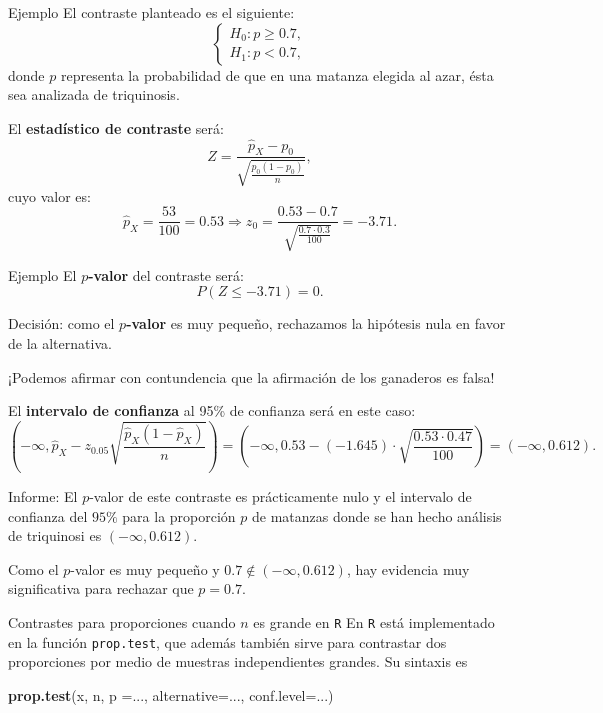 \documentclass[
  ignorenonframetext,
]{beamer}
\newenvironment{Shaded}{\begin{snugshade}}{\end{snugshade}}
\newcommand{\DataTypeTok}[1]{\textcolor[rgb]{0.13,0.29,0.53}{#1}}
\newcommand{\KeywordTok}[1]{\textcolor[rgb]{0.13,0.29,0.53}{\textbf{#1}}}
\newcommand{\NormalTok}[1]{#1}
\begin{document}
\begin{frame}{Ejemplo}
\protect\hypertarget{ejemplo-16}{}
El contraste planteado es el siguiente: \[\left\{\begin{array}{l}
H_0:p\geq 0.7,\\
H_1:p<0.7,
\end{array}
\right.\] donde \(p\) representa la probabilidad de que en una matanza
elegida al azar, ésta sea analizada de triquinosis.

El \textbf{estadístico de contraste} será: \[
Z=\frac{\widehat{p}_X-p_0}{\sqrt{\frac{p_0(1-p_0)}{n}}},
\] cuyo valor es: \[
\widehat{p}_X=\frac{53}{100}=0.53\Longrightarrow 
z_0=\frac{0.53-0.7}{\sqrt{\frac{0.7\cdot 0.3}{100}}}=-3.71.
\]
\end{frame}

\begin{frame}{Ejemplo}
\protect\hypertarget{ejemplo-17}{}
El \textbf{\(p\)-valor} del contraste será: \[
P(Z\leq -3.71)=0.
\]

Decisión: como el \textbf{\(p\)-valor} es muy pequeño, rechazamos la
hipótesis nula en favor de la alternativa.

¡Podemos afirmar con contundencia que la afirmación de los ganaderos es
falsa!

El \textbf{intervalo de confianza} al 95\% de confianza será en este
caso: \[
\left(-\infty,\widehat{p}_X-z_{0.05}\sqrt{\frac{\widehat{p}_X(1-\widehat{p}_X)}{n}}\right)=\left(-\infty,0.53 -(-1.645)\cdot \sqrt{\frac{0.53\cdot 0.47}{100}}\right) = \left(-\infty,0.612\right).
\]

Informe: El \(p\)-valor de este contraste es prácticamente nulo y el
intervalo de confianza del \(95\%\) para la proporción \(p\) de matanzas
donde se han hecho análisis de triquinosi es
\(\left(-\infty,0.612\right)\).

Como el \(p\)-valor es muy pequeño y
\(0.7\not\in \left(-\infty,0.612\right)\), hay evidencia muy
significativa para rechazar que \(p=0.7\).
\end{frame}

\begin{frame}[fragile]{Contrastes para proporciones cuando \(n\) es
grande en \texttt{R}}
\protect\hypertarget{contrastes-para-proporciones-cuando-n-es-grande-en-r}{}
En \texttt{R} está implementado en la función \texttt{prop.test}, que
además también sirve para contrastar dos proporciones por medio de
muestras independientes grandes. Su sintaxis es

\begin{Shaded}
\begin{Highlighting}[]
\KeywordTok{prop.test}\NormalTok{(x, n, }\DataTypeTok{p =}\NormalTok{..., }\DataTypeTok{alternative=}\NormalTok{..., }\DataTypeTok{conf.level=}\NormalTok{...)}
\end{Highlighting}
\end{Shaded}
\end{frame}
\end{document}
